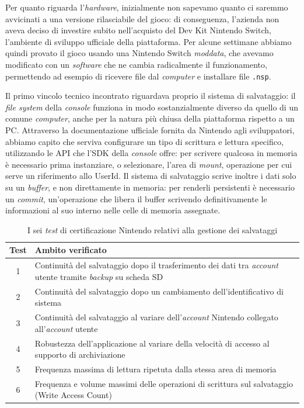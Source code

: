 Per quanto riguarda l'\textit{hardware}, inizialmente non sapevamo quanto ci saremmo avvicinati a una versione rilasciabile del gioco: di conseguenza, l'azienda non aveva deciso di investire subito nell'acquisto del Dev Kit Nintendo Switch, l'ambiente di sviluppo ufficiale della piattaforma. Per alcune settimane abbiamo quindi provato il gioco usando una Nintendo Switch \textit{moddata}, che avevamo modificato con un \textit{software} che ne cambia radicalmente il funzionamento, permettendo ad esempio di ricevere file dal \textit{computer} e installare file \texttt{.nsp}.
 
Il primo vincolo tecnico incontrato riguardava proprio il sistema di salvataggio: il \textit{file system} della \textit{console} funziona in modo sostanzialmente diverso da quello di un comune \textit{computer}, anche per la natura più chiusa della piattaforma rispetto a un PC. Attraverso la documentazione ufficiale fornita da Nintendo agli sviluppatori, abbiamo capito che serviva configurare un tipo di scrittura e lettura specifico, utilizzando le API che l'SDK della \textit{console} offre: per scrivere qualcosa in memoria è necessario prima instanziare, o selezionare, l'area di \textit{mount}, operazione per cui serve un riferimento allo UserId. Il sistema di salvataggio scrive inoltre i dati solo su un \textit{buffer}, e non direttamente in memoria: per renderli persistenti è necessario un \textit{commit}, un'operazione che libera il buffer scrivendo definitivamente le informazioni al suo interno nelle celle di memoria assegnate.
 
\begin{table}[h]
\centering
\begin{tabular}{|c|p{10cm}|}
\hline
\textbf{Test} & \textbf{Ambito verificato} \\
\hline
1 & Continuità del salvataggio dopo il trasferimento dei dati tra \textit{account} utente tramite \textit{backup} su scheda SD \\
\hline
2 & Continuità del salvataggio dopo un cambiamento dell'identificativo di sistema \\
\hline
3 & Continuità del salvataggio al variare dell'\textit{account} Nintendo collegato all'\textit{account} utente \\
\hline
4 & Robustezza dell'applicazione al variare della velocità di accesso al supporto di archiviazione \\
\hline
5 & Frequenza massima di lettura ripetuta dalla stessa area di memoria \\
\hline
6 & Frequenza e volume massimi delle operazioni di scrittura sul salvataggio (Write Access Count) \\
\hline
\end{tabular}
\caption{I sei \textit{test} di certificazione Nintendo relativi alla gestione dei salvataggi}
\label{tab:test-nintendo-salvataggi}
\end{table}
 

